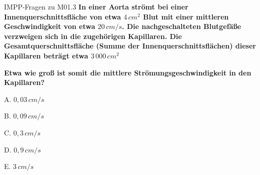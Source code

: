 \documentclass{beamer}
\begin{document}


\begin{frame}{IMPP-Fragen zu M01.3}
    \textbf{In einer Aorta strömt bei einer Innenquerschnittsfläche von etwa \(4\,cm^2\) Blut mit einer mittleren Geschwindigkeit von etwa \(20\,cm/s\). Die nachgeschalteten Blutgefäße verzweigen sich in die zugehörigen Kapillaren. Die Gesamtquerschnittsfläche (Summe der Innenquerschnittsflächen) dieser Kapillaren beträgt etwa \(3\,000\,cm^2\)}
    
    \textbf{
    Etwa wie groß ist somit die mittlere Strömungsgeschwindigkeit in den Kapillaren?
    }\\[0.2 cm]

\begin{description}
\item{A.} \(0,03\,cm/s\)
\item{B.} \(0,09\,cm/s\)
\item{C.} \(0,3\,cm/s\)
\item{D.} \(0,9\,cm/s\)
\item{E.} \(3\,cm/s\)

\end{description}
\end{frame}
\end{document}
